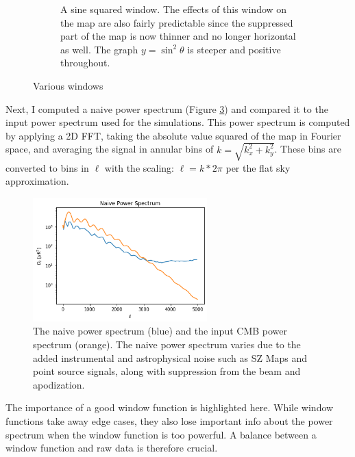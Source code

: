 \documentclass[12pt]{article}
\begin{document}
\begin{figure}[H]
\begin{subfigure}[t]{0.49\textwidth}
        \caption{A sine squared window. The effects of this window on the map are also fairly predictable since the suppressed part of the map is now thinner and no longer horizontal as well. The graph $y=\sin^2\theta$ is steeper and positive throughout.}
        \label{fig:sine_squared_window}
    \end{subfigure}
    \caption{Various windows}
    \label{fig:my_label}
\end{figure}

Next, I computed a naive power spectrum (Figure \ref{fig:naive}) and compared it to the input power spectrum used for the simulations. This power spectrum is computed by applying a 2D FFT, taking the absolute value squared of the map in Fourier space, and averaging the signal in annular bins of $k = \sqrt{k_x^2 + k_y^2}$.  These bins are converted to bins in $\ell$ with the scaling: $\ell = k* 2 \pi$ per the flat sky approximation.

\begin{figure}[H]
    \centering
    \includegraphics[width=0.6\textwidth]{images/Naive Power Spectrum.png}
    \caption{The naive power spectrum (blue) and the input CMB power spectrum (orange). The naive power spectrum varies due to the added instrumental and astrophysical noise such as SZ Maps and point source signals, along with suppression from the beam and apodization.}
    \label{fig:naive}
\end{figure}

The importance of a good window function is highlighted here. While window functions take away edge cases, they also lose important info about the power spectrum when the window function is too powerful. A balance between a window function and raw data is therefore crucial.
\end{document}
